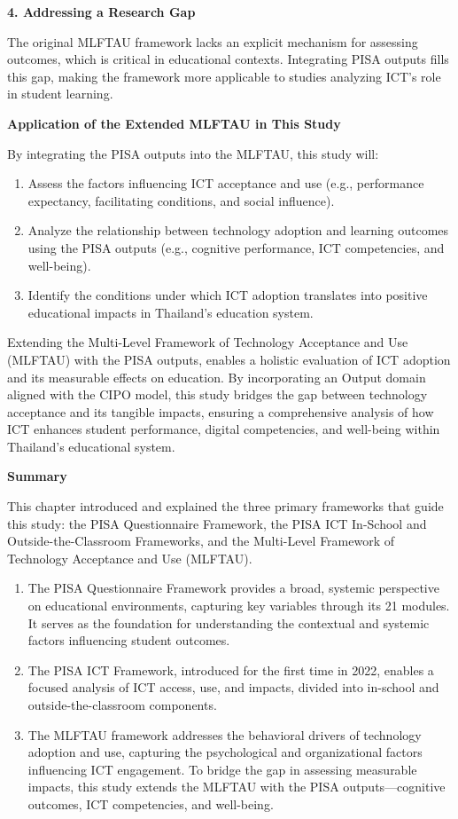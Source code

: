 \documentclass[
]{article}
\begin{document}
\textbf{4. Addressing a Research Gap}

The original MLFTAU framework lacks an explicit mechanism for assessing
outcomes, which is critical in educational contexts. Integrating PISA
outputs fills this gap, making the framework more applicable to studies
analyzing ICT's role in student learning.

\textbf{Application of the Extended MLFTAU in This Study}

By integrating the PISA outputs into the MLFTAU, this study will:

\begin{enumerate}
\def\labelenumi{\arabic{enumi}.}
\item
  Assess the factors influencing ICT acceptance and use (e.g.,
  performance expectancy, facilitating conditions, and social
  influence).
\item
  Analyze the relationship between technology adoption and learning
  outcomes using the PISA outputs (e.g., cognitive performance, ICT
  competencies, and well-being).
\item
  Identify the conditions under which ICT adoption translates into
  positive educational impacts in Thailand's education system.
\end{enumerate}

Extending the Multi-Level Framework of Technology Acceptance and Use
(MLFTAU) with the PISA outputs, enables a holistic evaluation of ICT
adoption and its measurable effects on education. By incorporating an
Output domain aligned with the CIPO model, this study bridges the gap
between technology acceptance and its tangible impacts, ensuring a
comprehensive analysis of how ICT enhances student performance, digital
competencies, and well-being within Thailand's educational system.

\textbf{Summary}

This chapter introduced and explained the three primary frameworks that
guide this study: the PISA Questionnaire Framework, the PISA ICT
In-School and Outside-the-Classroom Frameworks, and the Multi-Level
Framework of Technology Acceptance and Use (MLFTAU).

\begin{enumerate}
\def\labelenumi{\arabic{enumi}.}
\item
  The PISA Questionnaire Framework provides a broad, systemic
  perspective on educational environments, capturing key variables
  through its 21 modules. It serves as the foundation for understanding
  the contextual and systemic factors influencing student outcomes.
\item
  The PISA ICT Framework, introduced for the first time in 2022, enables
  a focused analysis of ICT access, use, and impacts, divided into
  in-school and outside-the-classroom components.
\item
  The MLFTAU framework addresses the behavioral drivers of technology
  adoption and use, capturing the psychological and organizational
  factors influencing ICT engagement. To bridge the gap in assessing
  measurable impacts, this study extends the MLFTAU with the PISA
  outputs---cognitive outcomes, ICT competencies, and well-being.
\end{enumerate}
\end{document}
